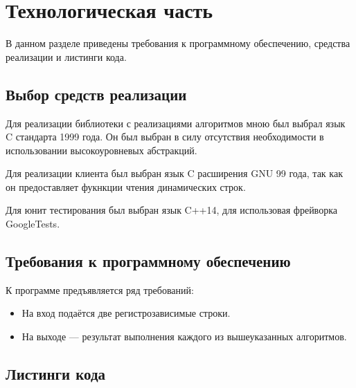 \chapter{Технологическая часть}

    В данном разделе приведены требования к программному обеспечению, средства реализации и листинги кода.
    
    \section{Выбор средств реализации}
        
        Для реализации библиотеки с реализациями алгоритмов мною был выбрал язык C\cite{cstd} стандарта 1999 года. Он был выбран в силу отсутствия необходимости в использовании высокоуровневых абстракций.
        
        Для реализации клиента был выбран язык C расширения GNU 99 года, так как он предоставляет фукнкции чтения динамических строк.
        
        Для юнит тестирования был выбран язык C++14, для использовая фрейворка GoogleTests\cite{gtests}.
    
    \section{Требования к программному обеспечению}
    
        К программе предъявляется ряд требований:
        
        \begin{itemize}
            \item На вход подаётся две регистрозависимые строки.
            \item На выходе — результат выполнения каждого из вышеуказанных алгоритмов.
        \end{itemize}
    
    \clearpage
    
    \section{Листинги кода}
    
        
        
        \clearpage
        
        
        
